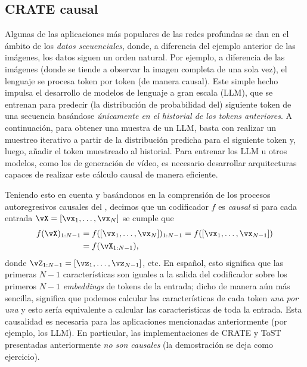 \documentclass[../../book-main.tex]{subfiles}
\begin{document}
\subsection{CRATE causal}
\label{sec:causal-crate}
Algunas de las aplicaciones más populares de las redes profundas se dan en el
ámbito de los \textit{datos secuenciales}, donde, a diferencia del ejemplo anterior
de las imágenes, los datos siguen un orden natural. Por ejemplo, a diferencia
de las imágenes (donde se tiende a observar la imagen completa de una sola vez),
el lenguaje se procesa token por token (de manera causal). Este simple
hecho impulsa el desarrollo de modelos de lenguaje a gran escala (LLM), que
se entrenan para predecir (la distribución de probabilidad del) siguiente
token de una secuencia basándose \textit{únicamente en el historial de los tokens 
anteriores}. A continuación, para obtener una muestra de un LLM, basta con realizar un muestreo iterativo
a partir de la distribución predicha para el siguiente token y, luego, añadir
el token muestreado al historial. Para entrenar los LLM u otros
modelos, como los de generación de vídeo, es necesario desarrollar
arquitecturas capaces de realizar este cálculo causal de manera eficiente.

Teniendo esto en cuenta y basándonos en la comprensión de los procesos autoregresivos causales
del , decimos que un codificador \(f\) es
\textit{causal} si para cada entrada \(\vX = [\vx_{1}, \dots, \vx_{N}]\) se cumple que
\begin{align}
    f(\vX)_{1:N-1}
    &= f([\vx_{1}, \dots, \vx_{N}])_{1:N-1} =
    f([\vx_{1}, \dots, \vx_{N - 1}]) \\
    &= f(\vX_{1:N-1}),
\end{align}
donde \(\vZ_{1:N-1} = [\vz_{1}, \dots, \vz_{N-1}]\), etc. En español,
esto significa que las primeras \(N-1\) características son iguales a la salida del
codificador sobre los primeros \(N-1\) \textit{embeddings} de tokens de la entrada; dicho de manera aún
más sencilla, significa que podemos calcular las características de cada token
\textit{una por una} y esto sería equivalente a calcular las
características de toda la entrada. Esta causalidad es necesaria para las
aplicaciones mencionadas anteriormente (por ejemplo, los LLM). En particular, las
implementaciones de CRATE y ToST presentadas anteriormente
\textit{no son causales} (la demostración se deja como ejercicio).
\end{document}
